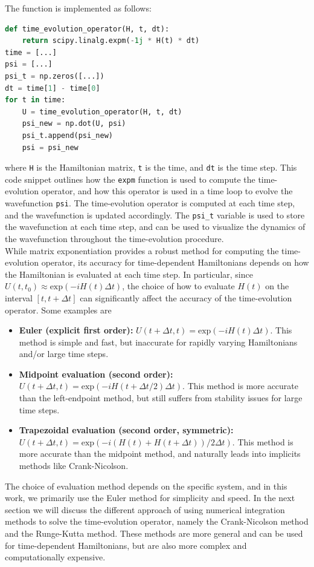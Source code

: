 \documentclass{subfiles}
\begin{document}
The function is implemented as follows:
\begin{lstlisting}[language=Python]
def time_evolution_operator(H, t, dt):
    return scipy.linalg.expm(-1j * H(t) * dt)
time = [...]
psi = [...]
psi_t = np.zeros([...])
dt = time[1] - time[0] 
for t in time:
    U = time_evolution_operator(H, t, dt)
    psi_new = np.dot(U, psi)
    psi_t.append(psi_new)
    psi = psi_new
\end{lstlisting}
where \texttt{H} is the Hamiltonian matrix, \texttt{t} is the time, and \texttt{dt} is the time step. This code snippet outlines how the \texttt{expm} function is used to compute the time-evolution operator, and how this operator is used in a time loop to evolve the wavefunction \texttt{psi}. The time-evolution operator is computed at each time step, and the wavefunction is updated accordingly. The \texttt{psi\_t} variable is used to store the wavefunction at each time step, and can be used to visualize the dynamics of the wavefunction throughout the time-evolution procedure. \\ 
While matrix exponentiation provides a robust method for computing the time-evolution operator, its accuracy for time-dependent Hamiltonians depends on how the Hamiltonian is evaluated at each time step. In particular, since $U(t, t_0) \approx \text{exp}(-iH(t)\Delta t)$, the choice of how to evaluate $H(t)$ on the interval $[t, t + \Delta t]$ can significantly affect the accuracy of the time-evolution operator. Some examples are
\begin{itemize}
    \item \textbf{Euler (explicit first order):} $U(t + \Delta t, t) = \text{exp}(-iH(t)\Delta t)$. This method is simple and fast, but inaccurate for rapidly varying Hamiltonians and/or large time steps. 
    \item \textbf{Midpoint evaluation (second order):} $U(t + \Delta t, t) = \text{exp}(-iH(t + \Delta t/2)\Delta t)$. This method is more accurate than the left-endpoint method, but still suffers from stability issues for large time steps.
    \item \textbf{Trapezoidal evaluation (second order, symmetric):} $U(t + \Delta t, t) = \text{exp}(-i(H(t) + H(t + \Delta t))/2 \Delta t)$. This method is more accurate than the midpoint method, and naturally leads into implicits methods like Crank-Nicolson. 
\end{itemize}
The choice of evaluation method depends on the specific system, and in this work, we primarily use the Euler method for simplicity and speed. In the next section we will discuss the different approach of using numerical integration methods to solve the time-evolution operator, namely the Crank-Nicolson method and the Runge-Kutta method. These methods are more general and can be used for time-dependent Hamiltonians, but are also more complex and computationally expensive.
\end{document}
